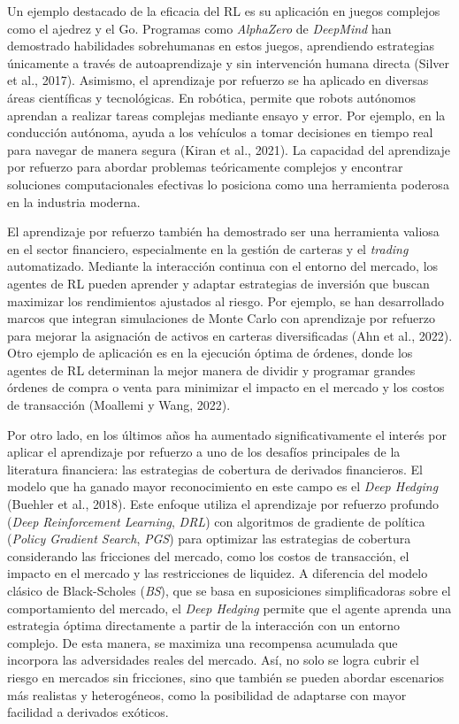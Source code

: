 \documentclass[11pt,a4paper,spanish]{article}
\numberwithin{equation}{section} %
\begin{document}
Un ejemplo destacado de la eficacia del RL es su aplicación en juegos complejos como el ajedrez y el Go. Programas como \textit{AlphaZero} de \textit{DeepMind} han demostrado habilidades sobrehumanas en estos juegos, aprendiendo estrategias únicamente a través de autoaprendizaje y sin intervención humana directa (Silver et al., 2017). Asimismo, el aprendizaje por refuerzo se ha aplicado en diversas áreas científicas y tecnológicas. En robótica, permite que robots autónomos aprendan a realizar tareas complejas mediante ensayo y error. Por ejemplo, en la conducción autónoma, ayuda a los vehículos a tomar decisiones en tiempo real para navegar de manera segura (Kiran et al., 2021). La capacidad del aprendizaje por refuerzo para abordar problemas teóricamente complejos y encontrar soluciones computacionales efectivas lo posiciona como una herramienta poderosa en la industria moderna.

El aprendizaje por refuerzo también ha demostrado ser una herramienta valiosa en el sector financiero, especialmente en la gestión de carteras y el \textit{trading} automatizado. Mediante la interacción continua con el entorno del mercado, los agentes de RL pueden aprender y adaptar estrategias de inversión que buscan maximizar los rendimientos ajustados al riesgo. Por ejemplo, se han desarrollado marcos que integran simulaciones de Monte Carlo con aprendizaje por refuerzo para mejorar la asignación de activos en carteras diversificadas (Ahn et al., 2022). Otro ejemplo de aplicación es en la ejecución óptima de órdenes, donde los agentes de RL determinan la mejor manera de dividir y programar grandes órdenes de compra o venta para minimizar el impacto en el mercado y los costos de transacción (Moallemi y Wang, 2022).

Por otro lado, en los últimos años ha aumentado significativamente el interés por aplicar el aprendizaje por refuerzo a uno de los desafíos principales de la literatura financiera: las estrategias de cobertura de derivados financieros. El modelo que ha ganado mayor reconocimiento en este campo es el \textit{Deep Hedging} (Buehler et al., 2018). Este enfoque utiliza el aprendizaje por refuerzo profundo (\textit{Deep Reinforcement Learning}, \textit{DRL}) con algoritmos de gradiente de política (\textit{Policy Gradient Search}, \textit{PGS}) para optimizar las estrategias de cobertura considerando las fricciones del mercado, como los costos de transacción, el impacto en el mercado y las restricciones de liquidez. A diferencia del modelo clásico de Black-Scholes (\textit{BS}), que se basa en suposiciones simplificadoras sobre el comportamiento del mercado, el \textit{Deep Hedging} permite que el agente aprenda una estrategia óptima directamente a partir de la interacción con un entorno complejo. De esta manera, se maximiza una recompensa acumulada que incorpora las adversidades reales del mercado. Así, no solo se logra cubrir el riesgo en mercados sin fricciones, sino que también se pueden abordar escenarios más realistas y heterogéneos, como la posibilidad de adaptarse con mayor facilidad a derivados exóticos.
\end{document}
